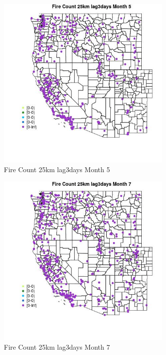 \begin{figure} 
\centering  
\includegraphics[width=0.77\textwidth]{Code_Outputs/Report_ML_input_PM25_Step4_part_e_de_duplicated_aves_compiled_2019-05-18wNAs_MapObsMo5Fire_Count_25km_lag3days.jpg} 
\caption{\label{fig:Report_ML_input_PM25_Step4_part_e_de_duplicated_aves_compiled_2019-05-18wNAsMapObsMo5Fire_Count_25km_lag3days}Fire Count 25km lag3days Month 5} 
\end{figure} 
 

\clearpage 

\begin{figure} 
\centering  
\includegraphics[width=0.77\textwidth]{Code_Outputs/Report_ML_input_PM25_Step4_part_e_de_duplicated_aves_compiled_2019-05-18wNAs_MapObsMo7Fire_Count_25km_lag3days.jpg} 
\caption{\label{fig:Report_ML_input_PM25_Step4_part_e_de_duplicated_aves_compiled_2019-05-18wNAsMapObsMo7Fire_Count_25km_lag3days}Fire Count 25km lag3days Month 7} 
\end{figure} 
 

